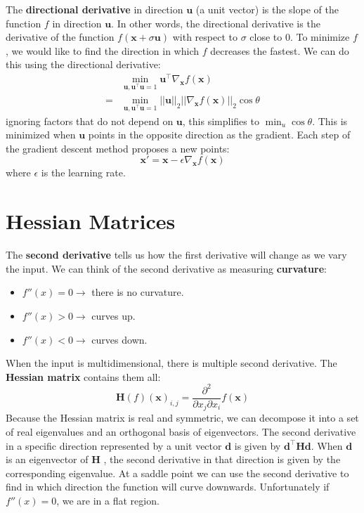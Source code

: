 \documentclass[12pt]{report}
\begin{document}
        The \textbf{directional derivative} in direction $\boldsymbol{u}$ (a unit vector) is the slope of the function $f$ in direction $\boldsymbol{u}$. In other words, the directional derivative is the derivative of the function $f(\boldsymbol{x} + \sigma \boldsymbol{u})$ with respect to $\sigma$ close to 0. To minimize $f$, we would like to find the direction in which $f$ decreases the fastest. We can do this using the directional derivative:
        \begin{align}
            &\min_{\boldsymbol{u}, \boldsymbol{u}^\top \boldsymbol{u} = 1}{\boldsymbol{u}^\top \nabla_{\boldsymbol{x}} f(\boldsymbol{x})} \\
            = &\min_{\boldsymbol{u}, \boldsymbol{u}^\top \boldsymbol{u} = 1}{||\boldsymbol{u}||_2 ||\nabla_{\boldsymbol{x}} f(\boldsymbol{x})||_2 \cos \theta}
        \end{align}
        ignoring factors that do not depend on $\boldsymbol{u}$, this simplifies to $\min_{u}{\cos \theta}$. This is minimized when $\boldsymbol{u}$ points in the opposite direction as the gradient. Each step of the gradient descent method proposes a new points:
        \begin{equation}
            \boldsymbol{x'} = \boldsymbol{x} - \epsilon \nabla_{\boldsymbol{x}}f(\boldsymbol{x})
        \end{equation}
        where $\epsilon$ is the learning rate.
        
    \section{Hessian Matrices}
        The \textbf{second derivative} tells us how the first derivative will change as we vary the input. We can think of the second derivative as measuring \textbf{curvature}:
        \begin{itemize}
            \item $f''(x) = 0 \rightarrow$ there is no curvature.
            \item $f''(x) > 0 \rightarrow$ curves up.
            \item $f''(x) < 0 \rightarrow$ curves down.
        \end{itemize}
        When the input is multidimensional, there is multiple second derivative. The \textbf{Hessian matrix} contains them all:
        \begin{equation}
            \boldsymbol{H}(f)(\boldsymbol{x})_{i,j} = \frac{\partial^2}{\partial x_j \partial x_i}f(\boldsymbol{x})
        \end{equation}
        Because the Hessian matrix is real and symmetric, we can decompose it into a set of real eigenvalues and an orthogonal basis of eigenvectors. The second derivative in a specific direction represented by a unit vector $\boldsymbol{d}$ is given by $\boldsymbol{d}^\top \boldsymbol{H}\boldsymbol{d}$. When $\boldsymbol{d}$ is an eigenvector of $\boldsymbol{H}$ , the second derivative in that direction is given by the corresponding eigenvalue. At a saddle point we can use the second derivative to find in which direction the function will curve downwards. Unfortunately if $f''(x) = 0$, we are in a flat region.
        
\end{document}
